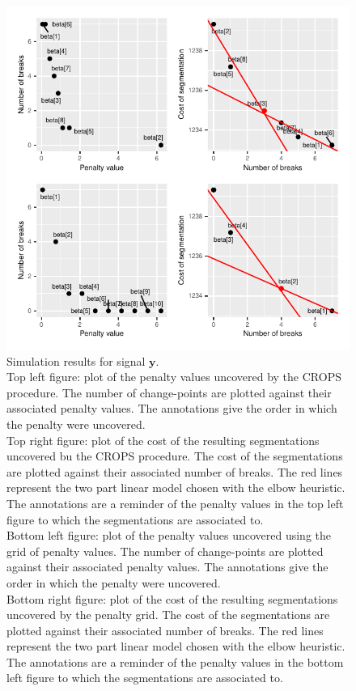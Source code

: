 \begin{figure}[htbp]
    \centering
    \includegraphics{figs/Chap4/RES_SIM_Y.pdf}
    \caption{Simulation results for signal $\bm y$. \\ 
    Top left figure: plot of the penalty values uncovered by the CROPS procedure. The number of change-points are plotted against their associated penalty values. The annotations give the order in which the penalty were uncovered. \\
    Top right figure: plot of the cost of the resulting segmentations uncovered bu the CROPS procedure. The cost of the segmentations are plotted against their associated number of breaks. The red lines represent the two part linear model chosen with the elbow heuristic. The annotations are a reminder of the penalty values in the top left figure to which the segmentations are associated to. \\
    Bottom left figure: plot of the penalty values uncovered using the grid of penalty values. The number of change-points are plotted against their associated penalty values. The annotations give the order in which the penalty were uncovered. \\
    Bottom right figure: plot of the cost of the resulting segmentations uncovered by the penalty grid. The cost of the segmentations are plotted against their associated number of breaks. The red lines represent the two part linear model chosen with the elbow heuristic. The annotations are a reminder of the penalty values in the bottom left figure to which the segmentations are associated to.}
    \label{fig:res_sim_y}
\end{figure}

